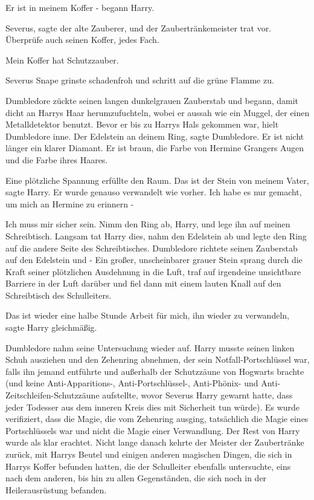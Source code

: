 \glqq Er ist in meinem Koffer -\grqq{} begann Harry.

\glqq Severus\grqq{}, sagte der alte Zauberer, und der Zaubertränkemeister trat
vor. \glqq Überprüfe auch seinen Koffer, jedes Fach.\grqq{}

\glqq Mein Koffer hat Schutzzauber.\grqq{}

Severus Snape grinste schadenfroh und schritt auf die grüne Flamme zu.

Dumbledore zückte seinen langen dunkelgrauen Zauberstab und begann, damit dicht
an Harrys Haar herumzufuchteln, wobei er aussah wie ein Muggel, der einen
Metalldetektor benutzt. Bevor er bis zu Harrys Hals gekommen war, hielt
Dumbledore inne. \glqq Der Edelstein an deinem Ring\grqq{}, sagte Dumbledore.
\glqq Er ist nicht länger ein klarer Diamant. Er ist braun, die Farbe von
Hermine Grangers Augen und die Farbe ihres Haares.\grqq{}

Eine plötzliche Spannung erfüllte den Raum. \glqq Das ist der Stein von meinem
Vater\grqq{}, sagte Harry. \glqq Er wurde genauso verwandelt wie vorher. Ich
habe es nur gemacht, um mich an Hermine zu erinnern -\grqq{}

\glqq Ich muss mir sicher sein. Nimm den Ring ab, Harry, und lege ihn auf meinen
Schreibtisch.\grqq{} Langsam tat Harry dies, nahm den Edelstein ab und legte den
Ring auf die andere Seite des Schreibtisches. Dumbledore richtete seinen
Zauberstab auf den Edelstein und - Ein großer, unscheinbarer grauer Stein sprang
durch die Kraft seiner plötzlichen Ausdehnung in die Luft, traf auf irgendeine
unsichtbare Barriere in der Luft darüber und fiel dann mit einem lauten Knall
auf den Schreibtisch des Schulleiters.

\glqq Das ist wieder eine halbe Stunde Arbeit für mich, ihn wieder zu
verwandeln\grqq{}, sagte Harry gleichmäßig.

Dumbledore nahm seine Untersuchung wieder auf. Harry musste seinen linken Schuh
ausziehen und den Zehenring abnehmen, der sein Notfall-Portschlüssel war, falls
ihn jemand entführte und außerhalb der Schutzzäune von Hogwarts brachte (und
keine Anti-Apparitions-, Anti-Portschlüssel-, Anti-Phönix- und
Anti-Zeitschleifen-Schutzzäune aufstellte, wovor Severus Harry gewarnt hatte,
dass jeder Todesser aus dem inneren Kreis dies mit Sicherheit tun würde). Es
wurde verifiziert, dass die Magie, die vom Zehenring ausging, tatsächlich die
Magie eines Portschlüssels war und nicht die Magie einer Verwandlung. Der Rest
von Harry wurde als klar erachtet. Nicht lange danach kehrte der Meister der
Zaubertränke zurück, mit Harrys Beutel und einigen anderen magischen Dingen, die
sich in Harrys Koffer befunden hatten, die der Schulleiter ebenfalls
untersuchte, eins nach dem anderen, bis hin zu allen Gegenständen, die sich noch
in der Heilerausrüstung befanden.

